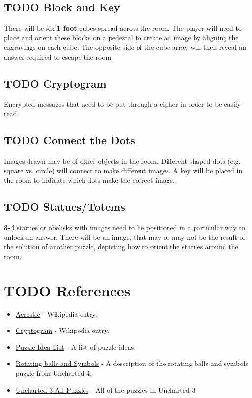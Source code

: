 \documentclass[11pt]{article}
\begin{document}
\subsection{{\bfseries\sffamily TODO} Block and Key}
\label{sec:org3e81b37}
There will be six \textbf{1 foot} cubes spread across the room. The player will need to place and orient these blocks on a pedestal to create an image by aligning the engravings on each cube. The opposite side of the cube array will then reveal an answer required to escape the room.

\subsection{{\bfseries\sffamily TODO} Cryptogram}
\label{sec:orgee02e3b}
Encrypted messages that need to be put through a cipher in order to be easily read.

\subsection{{\bfseries\sffamily TODO} Connect the Dots}
\label{sec:org8779e08}
Images drawn may be of other objects in the room. Different shaped dots (e.g. square vs. circle) will connect to make different images. A key will be placed in the room to indicate which dots make the correct image.

\subsection{{\bfseries\sffamily TODO} Statues/Totems}
\label{sec:org0f000e4}
\textbf{3-4} statues or obelisks with images need to be positioned in a particular way to unlock an answer. There will be an image, that may or may not be the result of the solution of another puzzle, depicting how to orient the statues around the room.

\section{{\bfseries\sffamily TODO} References}
\label{sec:org8bb5721}
\begin{itemize}
\item \href{https://en.wikipedia.org/wiki/Acrostic\_(puzzle)}{Acrostic} - Wikipedia entry.
\item \href{https://en.wikipedia.org/wiki/Cryptogram}{Cryptogram} - Wikipedia entry.
\item \href{http://www.bloodandbones.com/ph12sim/types.htm}{Puzzle Idea List} - A list of puzzle ideas.
\item \href{http://www.accelerated-ideas.com/news/uncharted-4-chapter-1-2-puzzle-solution-rotating-balls.aspx}{Rotating balls and Symbols} - A description of the rotating balls and symbols puzzle from Uncharted 4.
\item \href{http://www.gameshampoo.com/magazine/articles/24/uncharted-3-all-puzzle-solutions.html}{Uncharted 3 All Puzzles} - All of the puzzles in Uncharted 3.
\end{itemize}
\end{document}
